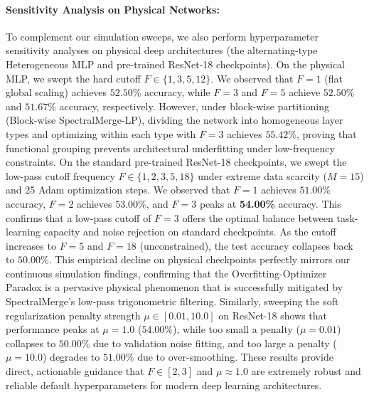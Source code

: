 \documentclass{article}
\theoremstyle{plain}
\theoremstyle{definition}
\theoremstyle{remark}
\begin{document}
\paragraph{Sensitivity Analysis on Physical Networks:}
To complement our simulation sweeps, we also perform hyperparameter sensitivity analyses on physical deep architectures (the alternating-type Heterogeneous MLP and pre-trained ResNet-18 checkpoints). 
On the physical MLP, we swept the hard cutoff $F \in \{1, 3, 5, 12\}$. We observed that $F=1$ (flat global scaling) achieves $52.50\%$ accuracy, while $F=3$ and $F=5$ achieve $52.50\%$ and $51.67\%$ accuracy, respectively. However, under block-wise partitioning (Block-wise SpectralMerge-LP), dividing the network into homogeneous layer types and optimizing within each type with $F=3$ achieves $55.42\%$, proving that functional grouping prevents architectural underfitting under low-frequency constraints.
On the standard pre-trained ResNet-18 checkpoints, we swept the low-pass cutoff frequency $F \in \{1, 2, 3, 5, 18\}$ under extreme data scarcity ($M = 15$) and 25 Adam optimization steps. 
We observed that $F=1$ achieves $51.00\%$ accuracy, $F=2$ achieves $53.00\%$, and $F=3$ peaks at \textbf{54.00\%} accuracy. This confirms that a low-pass cutoff of $F=3$ offers the optimal balance between task-learning capacity and noise rejection on standard checkpoints. As the cutoff increases to $F=5$ and $F=18$ (unconstrained), the test accuracy collapses back to $50.00\%$. This empirical decline on physical checkpoints perfectly mirrors our continuous simulation findings, confirming that the Overfitting-Optimizer Paradox is a pervasive physical phenomenon that is successfully mitigated by SpectralMerge's low-pass trigonometric filtering.
Similarly, sweeping the soft regularization penalty strength $\mu \in [0.01, 10.0]$ on ResNet-18 shows that performance peaks at $\mu = 1.0$ ($54.00\%$), while too small a penalty ($\mu=0.01$) collapses to $50.00\%$ due to validation noise fitting, and too large a penalty ($\mu=10.0$) degrades to $51.00\%$ due to over-smoothing. These results provide direct, actionable guidance that $F \in [2, 3]$ and $\mu \approx 1.0$ are extremely robust and reliable default hyperparameters for modern deep learning architectures.
\end{document}
